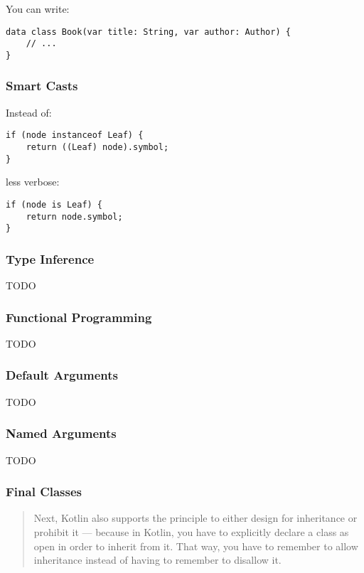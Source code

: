 \documentclass[a4paper,12pt]{article}
\begin{document}
You can write:

\begin{verbatim}
data class Book(var title: String, var author: Author) {
    // ...
}	
\end{verbatim}

\subsubsection{Smart Casts}

Instead of:

\begin{verbatim}
if (node instanceof Leaf) {
    return ((Leaf) node).symbol;
}	
\end{verbatim}

less verbose:

\begin{verbatim}
if (node is Leaf) {
    return node.symbol;
}	
\end{verbatim}

\subsubsection{Type Inference}
TODO

\subsubsection{Functional Programming}
TODO

\subsubsection{Default Arguments}
TODO

\subsubsection{Named Arguments}
TODO

\subsubsection{Final Classes}

\begin{quotation}
Next, Kotlin also supports the principle to either design for inheritance or prohibit it — because in Kotlin, you have to explicitly declare a class as open in order to inherit from it. That way, you have to remember to allow inheritance instead of having to remember to disallow it.\cite{kotlin-sommerhoff}
\end{quotation}
\end{document}
